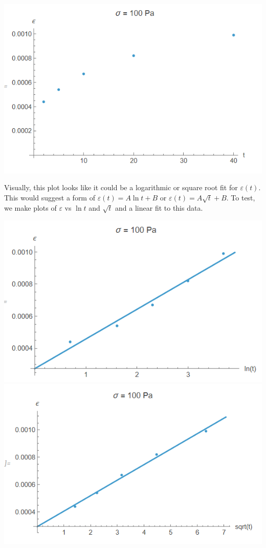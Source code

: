 \documentclass[preprint,12pt,authoryear]{elsarticle}
\begin{document}
\includegraphics[scale=0.5]{Dawson-figures/100-data.png}

Visually, this plot looks like it could be a logarithmic or square root fit for $\varepsilon(t)$. This would suggest a form of $\varepsilon(t) = A\ln{t}+B$ or $\varepsilon(t) = A\sqrt{t}+B$. To test, we make plots of $\varepsilon$ vs $\ln{t}$ and $\sqrt{t}$ and a linear fit to this data.

\includegraphics[scale=0.5]{Dawson-figures/100-ln.png}
\includegraphics[scale=0.5]{Dawson-figures/100-sqrt.png}
\end{document}
